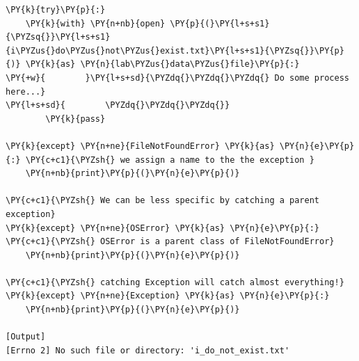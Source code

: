 \begin{Verbatim}[label=\makebox{\url{https://github.com/lucabaldini/cmepda/tree/master/slides/latex/snippets/try\_block.py}},commandchars=\\\{\}]
\PY{k}{try}\PY{p}{:}
    \PY{k}{with} \PY{n+nb}{open} \PY{p}{(}\PY{l+s+s1}{\PYZsq{}}\PY{l+s+s1}{i\PYZus{}do\PYZus{}not\PYZus{}exist.txt}\PY{l+s+s1}{\PYZsq{}}\PY{p}{)} \PY{k}{as} \PY{n}{lab\PYZus{}data\PYZus{}file}\PY{p}{:}
\PY{+w}{        }\PY{l+s+sd}{\PYZdq{}\PYZdq{}\PYZdq{} Do some process here...}
\PY{l+s+sd}{        \PYZdq{}\PYZdq{}\PYZdq{}}
        \PY{k}{pass}
        
\PY{k}{except} \PY{n+ne}{FileNotFoundError} \PY{k}{as} \PY{n}{e}\PY{p}{:} \PY{c+c1}{\PYZsh{} we assign a name to the the exception }
    \PY{n+nb}{print}\PY{p}{(}\PY{n}{e}\PY{p}{)}

\PY{c+c1}{\PYZsh{} We can be less specific by catching a parent exception}
\PY{k}{except} \PY{n+ne}{OSError} \PY{k}{as} \PY{n}{e}\PY{p}{:} \PY{c+c1}{\PYZsh{} OSError is a parent class of FileNotFoundError}
    \PY{n+nb}{print}\PY{p}{(}\PY{n}{e}\PY{p}{)}

\PY{c+c1}{\PYZsh{} catching Exception will catch almost everything!}
\PY{k}{except} \PY{n+ne}{Exception} \PY{k}{as} \PY{n}{e}\PY{p}{:}
    \PY{n+nb}{print}\PY{p}{(}\PY{n}{e}\PY{p}{)}

[Output]
[Errno 2] No such file or directory: 'i_do_not_exist.txt'
\end{Verbatim}